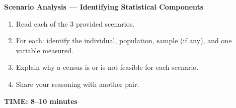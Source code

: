 \documentclass[aspectratio=169, 11pt]{beamer}
\begin{document}
{\begin{frame}[t, plain]
\begin{minipage}{0.93\textwidth}
\begin{columns}[T]
    \end{columns}
  \end{minipage}
\end{frame}
}

{
\begin{frame}[t, plain]
  \vspace{1.05cm}\par
  \hspace{0.55cm}%
  \begin{minipage}{0.9\textwidth}
    \vspace{1em}
    \small
    \textbf{Scenario Analysis --- Identifying Statistical Components}\\[6pt]
    \begin{enumerate}
      \setlength{\itemsep}{0.4em}\setlength{\topsep}{0em}
      \item Read each of the 3 provided scenarios.
      \item For each: identify the individual, population, sample (if any),
        and one variable measured.
      \item Explain why a census is or is not feasible for each scenario.
      \item Share your reasoning with another pair.
    \end{enumerate}
    \vspace{0.6cm}
    {\color{redacc}\bfseries\small TIME: 8--10 minutes}
  \end{minipage}
\end{frame}
}
\end{document}
